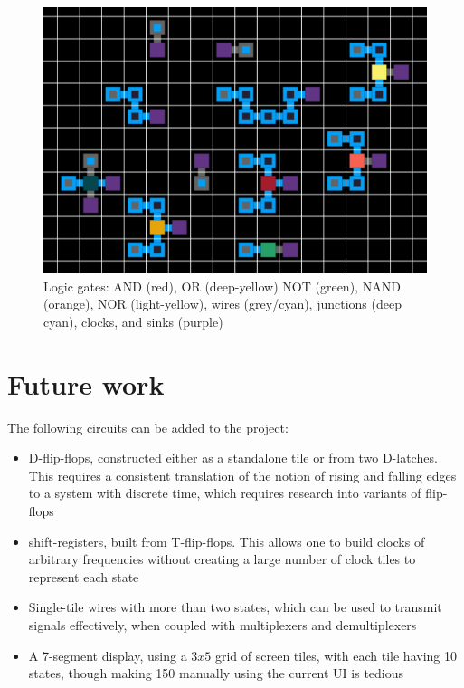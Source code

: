 \documentclass[letterpaper,11pt]{article}
\begin{document}
\begin{figure}[h!tbp]
	\centering
	\includegraphics[width=6.4in]{figures/gates-wires-clocks.png}
	\caption{Logic gates: AND (red), OR (deep-yellow) NOT (green), NAND (orange), NOR (light-yellow), wires (grey/cyan), junctions (deep cyan), clocks,  and sinks (purple)}
	\label{fig:2}
\end{figure}


\section*{Future work}

The following circuits can be added to the project:

\begin{itemize}
	\item D-flip-flops, constructed either as a standalone tile or from two D-latches. This requires a consistent translation of the notion of rising and falling edges to a system with discrete time, which requires research into variants of flip-flops
	\item shift-registers, built from T-flip-flops. This allows one to build clocks of arbitrary frequencies without creating a large number of clock tiles to represent each state
	\item Single-tile wires with more than two states, which can be used to transmit signals effectively, when coupled with multiplexers and demultiplexers
	\item A 7-segment display, using a $3 x 5$ grid of screen tiles, with each tile having 10 states, though making 150 manually using the current UI is tedious
\end{itemize}
\end{document}
